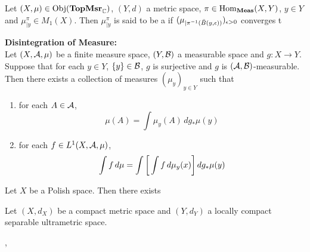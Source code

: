 \documentclass{book}
\begin{document}
\begin{defn}
	Let $(X, \mu) \in \operatorname{Obj}(\operatorname{\text{\textbf{TopMsr}}_{\mathbb{C}}})$, $(Y,d)$ a metric space, $\pi \in \operatorname{Hom}_{\operatorname{\text{\textbf{Meas}}}}(X, Y)$, $y \in Y$ and $\mu_{|y}^{\pi} \in M_1(X)$. Then $\mu_{|y}^{\pi}$ is said to be a  if $(\mu_{|\pi^{-1}(\bar{B}(y, \epsilon))})_{\epsilon > 0}$ converges t    
\end{defn}


\begin{ex} \textbf{Disintegration of Measure:} \\
	Let $(X, \mathcal{A}, \mu)$ be a finite measure space, $(Y, \mathcal{B})$ a measurable space and $g: X \rightarrow Y$. Suppose that for each $y \in Y$, $\{y\} \in \mathcal{B}$, $g$ is surjective and $g$ is $(\mathcal{A}, \mathcal{B})$-measurable. Then there exists a collection of measures $(\mu_y)_{y \in Y}$ such that  
	\begin{enumerate}
		\item for each $A \in \mathcal{A}$, 
		$$\mu(A) = \int \mu_y(A) \, d g_*\mu(y) $$
		\item for each $f \in L^1(X, \mathcal{A}, \mu)$, 
		$$\int f \, d \mu = \int \bigg[ \int f \, d\mu_y(x) \bigg] \, d g_*\mu(y)$$ 
	\end{enumerate}
\end{ex}

\begin{ex}
	Let $X$ be a Polish space. Then there exists 
\end{ex}

\begin{ex}
	Let $(X, d_X)$ be a compact metric space and $(Y, d_Y)$ a locally compact separable ultrametric space.
\end{ex}

, 
\end{document}
